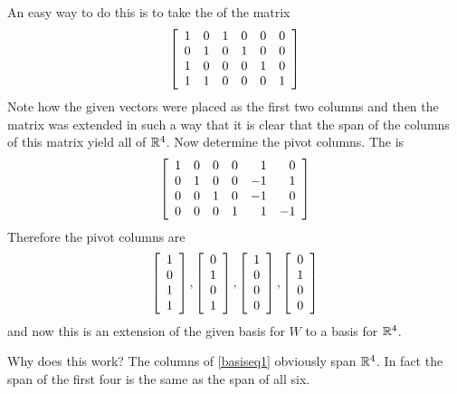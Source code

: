 \begin{solution}
An easy way to do this is to take the {\rref} of the matrix 
\begin{equation}
\left[
\begin{array}{cccccc}
1 & 0 & 1 & 0 & 0 & 0 \\ 
0 & 1 & 0 & 1 & 0 & 0 \\ 
1 & 0 & 0 & 0 & 1 & 0 \\ 
1 & 1 & 0 & 0 & 0 & 1
\end{array}
\right]  \label{basiseq1}
\end{equation}
Note how the given vectors were placed as the first two columns and then the matrix
was extended in such a way that it is clear that the span of the columns of
this matrix yield all of $\mathbb{R}^{4}$. Now determine the pivot columns.
The {\rref} is 
\begin{equation}
\left[
\begin{array}{rrrrrr}
1 & 0 & 0 & 0 & 1 & 0 \\ 
0 & 1 & 0 & 0 & -1 & 1 \\ 
0 & 0 & 1 & 0 & -1 & 0 \\ 
0 & 0 & 0 & 1 & 1 & -1
\end{array}
\right]  \label{basiseq2}
\end{equation}
Therefore the pivot columns are 
\begin{equation*}
\left[
\begin{array}{c}
1 \\ 
0 \\ 
1 \\ 
1
\end{array}
\right] ,\left[ 
\begin{array}{c}
0 \\ 
1 \\ 
0 \\ 
1
\end{array}
\right] ,\left[ 
\begin{array}{c}
1 \\ 
0 \\ 
0 \\ 
0
\end{array}
\right] ,\left[ 
\begin{array}{c}
0 \\ 
1 \\ 
0 \\ 
0
\end{array}
\right]
\end{equation*}
and now this is an extension of the given basis for $W$ to a basis for $
\mathbb{R}^{4}$.

Why does this work? The columns of \ref{basiseq1} obviously span $\mathbb{R}^{4}$. In fact the span of the first four is the same as the span of all
six. 
\end{solution}

